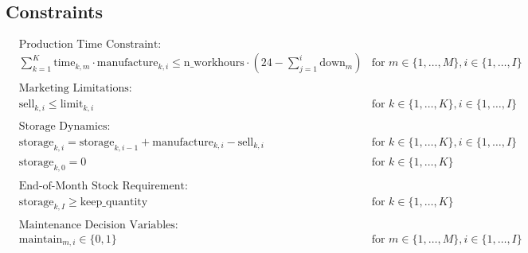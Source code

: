 \documentclass{article}
\begin{document}
\subsection*{Constraints}
\begin{align}
    & \text{Production Time Constraint:} \\
    & \sum_{k=1}^{K} \text{time}_{k,m} \cdot \text{manufacture}_{k,i} \leq \text{n\_workhours} \cdot (24 - \sum_{j=1}^{i} \text{down}_m) & \text{for } m \in \{1, \ldots, M\}, i \in \{1, \ldots, I\} \\
    \\
    & \text{Marketing Limitations:} \\
    & \text{sell}_{k,i} \leq \text{limit}_{k,i} & \text{for } k \in \{1, \ldots, K\}, i \in \{1, \ldots, I\} \\
    \\
    & \text{Storage Dynamics:} \\
    & \text{storage}_{k,i} = \text{storage}_{k,i-1} + \text{manufacture}_{k,i} - \text{sell}_{k,i} & \text{for } k \in \{1, \ldots, K\}, i \in \{1, \ldots, I\} \\
    & \text{storage}_{k,0} = 0 & \text{for } k \in \{1, \ldots, K\} \\
    \\
    & \text{End-of-Month Stock Requirement:} \\
    & \text{storage}_{k,I} \geq \text{keep\_quantity} & \text{for } k \in \{1, \ldots, K\} \\
    \\
    & \text{Maintenance Decision Variables:} \\
    & \text{maintain}_{m,i} \in \{0, 1\} & \text{for } m \in \{1, \ldots, M\}, i \in \{1, \ldots, I\}
\end{align}
\end{document}
